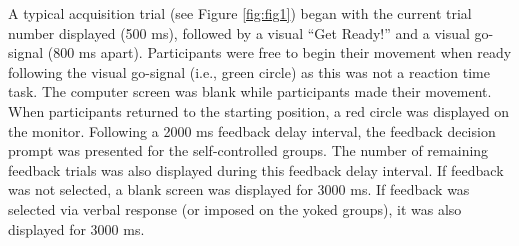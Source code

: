 \documentclass[
  doc, donotrepeattitle,floatsintext]{apa7}
\begin{document}
\clearpage

\begin{table}

\caption{\label{tab:table1}Cronbach's alpha for each questionnaire at each timepoint.}
\end{table}

A typical acquisition trial (see Figure \ref{fig:fig1}) began with the current trial number displayed (500 ms), followed by a visual ``Get Ready!'' and a visual go-signal (800 ms apart). Participants were free to begin their movement when ready following the visual go-signal (i.e., green circle) as this was not a reaction time task. The computer screen was blank while participants made their movement. When participants returned to the starting position, a red circle was displayed on the monitor. Following a 2000 ms feedback delay interval, the feedback decision prompt was presented for the self-controlled groups. The number of remaining feedback trials was also displayed during this feedback delay interval. If feedback was not selected, a blank screen was displayed for 3000 ms. If feedback was selected via verbal response (or imposed on the yoked groups), it was also displayed for 3000 ms.
\end{document}
